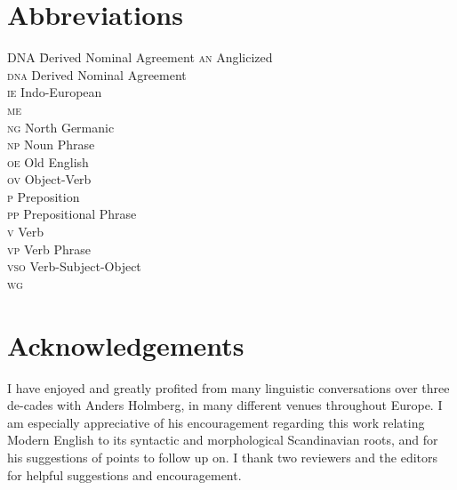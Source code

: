 \documentclass[output=paper]{LSP/langsci}
\begin{document}
\section*{Abbreviations}
\begin{multicols}{2}
\begin{tabbing}
DNA \= Derived Nominal Agreement\kill
\textsc{an}  \> Anglicized \\
\textsc{dna} \> Derived Nominal Agreement\\
\textsc{ie}  \> Indo-European\\
\textsc{me}  \> \\
\textsc{ng}  \> North Germanic\\
\textsc{np}  \> Noun Phrase\\
\textsc{oe}  \> Old English\\
\textsc{ov}  \> Object-Verb\\
\textsc{p}   \> Preposition\\
\textsc{pp}  \> Prepositional Phrase\\
\textsc{v}   \> Verb\\
\textsc{vp}  \> Verb Phrase\\
\textsc{vso} \> Verb-Subject-Object\\
\textsc{wg}  \> 
\end{tabbing}
\end{multicols}


\section*{Acknowledgements}
I have enjoyed and greatly profited from many linguistic conversations over three de-\linebreak cades with Anders Holmberg, in many different venues throughout Europe. I am especially appreciative of his encouragement regarding this work relating Modern English to its syntactic and {morphological} {Scandinavian} roots, and for his suggestions of points to follow up on. 
I thank two reviewers and the editors for helpful suggestions and encouragement.

\printbibliography[heading=subbibliography,notkeyword=this]
\end{document}

